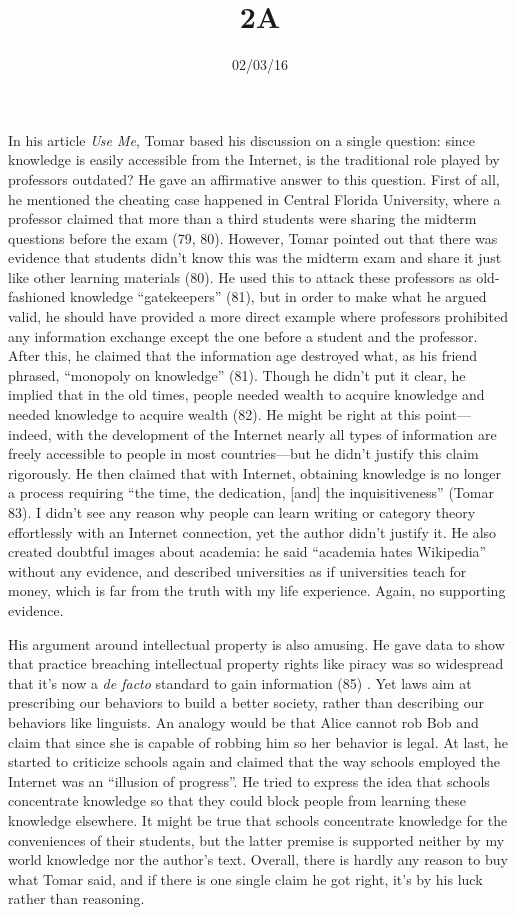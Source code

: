 \documentclass{writing}
\title{2A}
\date{02/03/16}
\begin{document}
\maketitle

In his article \emph{Use Me}, Tomar based his discussion on a single
question: since knowledge is easily accessible from the Internet, is the
traditional role played by professors outdated? He gave an affirmative
answer to this question. First of all, he mentioned the cheating case
happened in Central Florida University, where a professor claimed that
more than a third students were sharing the midterm questions before the
exam (79, 80). However, Tomar pointed out that there was evidence that
students didn't know this was the midterm exam and share it just like
other learning materials (80). He used this to attack these professors
as old-fashioned knowledge ``gatekeepers'' (81), but in order to make
what he argued valid, he should have provided a more direct example
where professors prohibited any information exchange except the one
before a student and the professor. After this, he claimed that the
information age destroyed what, as his friend phrased, ``monopoly on
knowledge'' (81). Though he didn't put it clear, he implied that in the
old times, people needed wealth to acquire knowledge and needed
knowledge to acquire wealth (82). He might be right at this
point---indeed, with the development of the Internet nearly all types of
information are freely accessible to people in most countries---but he
didn't justify this claim rigorously. He then claimed that with
Internet, obtaining knowledge is no longer a process requiring ``the
time, the dedication, {[}and{]} the inquisitiveness'' (Tomar 83). I
didn't see any reason why people can learn writing or category theory
effortlessly with an Internet connection, yet the author didn't justify
it. He also created doubtful images about academia: he said ``academia
hates Wikipedia'' without any evidence, and described universities as if
universities teach for money, which is far from the truth with my life
experience. Again, no supporting evidence.

His argument around intellectual property is also amusing. He gave data
to show that practice breaching intellectual property rights like piracy
was so widespread that it's now a \emph{de facto} standard to gain
information (85) . Yet laws aim at prescribing our behaviors to build a
better society, rather than describing our behaviors like linguists. An
analogy would be that Alice cannot rob Bob and claim that since she is
capable of robbing him so her behavior is legal. At last, he started to
criticize schools again and claimed that the way schools employed the
Internet was an ``illusion of progress''. He tried to express the idea
that schools concentrate knowledge so that they could block people from
learning these knowledge elsewhere. It might be true that schools
concentrate knowledge for the conveniences of their students, but the
latter premise is supported neither by my world knowledge nor the
author's text. Overall, there is hardly any reason to buy what Tomar
said, and if there is one single claim he got right, it's by his luck
rather than reasoning.
\end{document}
